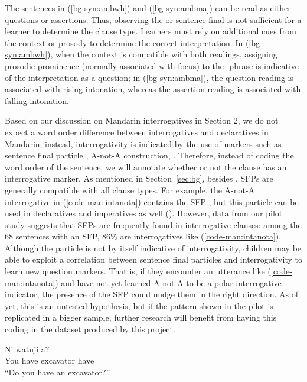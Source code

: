 \noindent 
The sentences in (\ref{bg-syn:ambwh}) and (\ref{bg-syn:ambma}) can be read as either questions or assertions. Thus, observing the \twh{}  or sentence final \ma{} is not sufficient for a learner to determine the clause type. Learners must rely on additional cues from the context or prosody to determine the correct interpretation. In (\ref{bg-syn:ambwh}), when the context is compatible with both readings, assigning prosodic prominence (normally associated with focus) to the \twh-phrase is indicative of the interpretation as a question; in (\ref{bg-syn:ambma}), the question reading is associated with rising intonation, whereas the assertion reading is associated with falling intonation. 


Based on our discussion on Mandarin interrogatives in Section 2, we do not expect a word order difference between interrogatives and declaratives in Mandarin; instead, interrogativity is indicated by the use of markers such as sentence final particle \ma{}, A-not-A construction, \twh{}. Therefore, instead of coding the word order of the sentence, we will annotate whether or not the clause has an interrogative marker. As mentioned in Section~\ref{sec:bg}, besides \ma{}, SFPs are generally compatible with all clause types. For example, the A-not-A interrogative in (\ref{code-man:intanota}) contains the SFP , but this particle can be used in declaratives and imperatives as well (\citealt{chao1968, lithompson}). However, data from our pilot study suggests that SFPs are frequently found in interrogative clauses: among the 68 sentences with an SFP, 86\% are interrogatives like (\ref{code-man:intanota}). Although the particle  is not by itself indicative of interrogativity, children may be able to exploit a correlation between sentence final particles and interrogativity to learn new question markers. That is, if they encounter an utterance like (\ref{code-man:intanota}) and have not yet learned A-not-A to be a polar interrogative indicator, the presence of the SFP  could nudge them in the right direction. As of yet, this is an untested hypothesis, but if the pattern shown in the pilot is replicated in a bigger sample, further research will benefit from having this coding in the dataset produced by this project.


\gll Ni		watuji		a?	\\
You have	excavator	{\Neg{}	have}	\Sfp\\
``Do you have an excavator?'' \hfill {}
\eex



